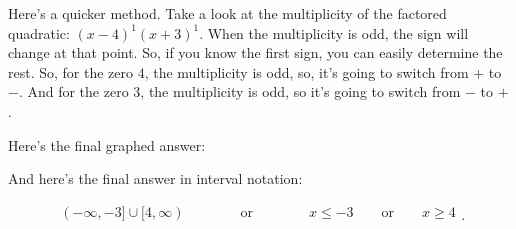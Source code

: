 Here's a quicker method. Take a look at the multiplicity of the factored
quadratic: $(x - 4)^{1}(x + 3)^{1}$. When the multiplicity is odd, the sign will
change at that point. So, if you know the first sign, you can easily determine
the rest. So, for the zero $4$, the multiplicity is odd, so, it's going to
switch from $+$ to $-$. And for the zero $3$, the multiplicity is odd, so it's
going to switch from  $-$ to $+$.

Here's the final graphed answer:


And here's the final answer in interval notation:

\begin{equation}
  \label{eqt:final_answer_in_interval_notation}
  \begin{split}
    (-\infty, -3]\cup[4,\infty) \qquad\qquad \textrm{or} \qquad\qquad
    x \le -3 \qquad \textrm{or} \qquad x \ge 4 \\
  \end{split}
.\end{equation}

\newpage
